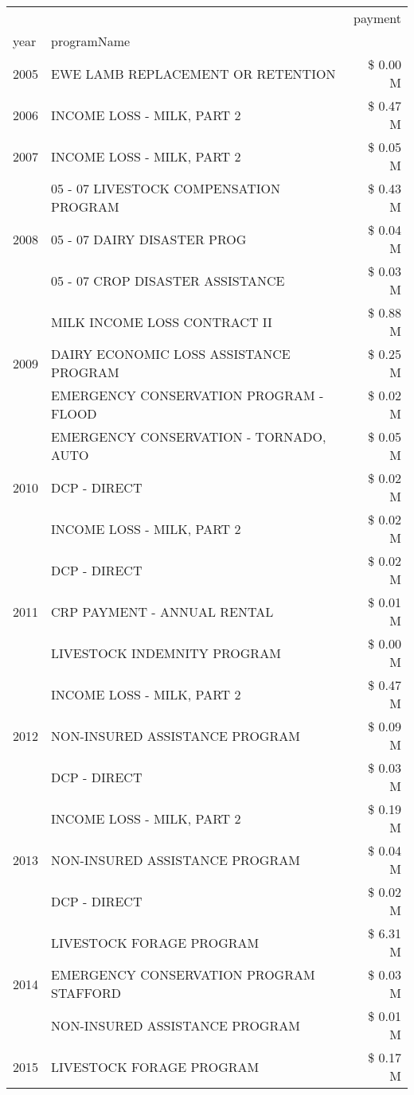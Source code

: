 \begin{tabular}{llr}
\toprule
 &  & payment \\
year & programName &  \\
\midrule
2005 & EWE LAMB REPLACEMENT OR RETENTION & \$ 0.00 M \\
\cline{1-3}
2006 & INCOME LOSS - MILK, PART 2 & \$ 0.47 M \\
\cline{1-3}
2007 & INCOME LOSS - MILK, PART 2 & \$ 0.05 M \\
\cline{1-3}
\multirow[t]{3}{*}{2008} & 05 - 07 LIVESTOCK COMPENSATION PROGRAM & \$ 0.43 M \\
 & 05 - 07 DAIRY DISASTER PROG & \$ 0.04 M \\
 & 05 - 07 CROP DISASTER ASSISTANCE & \$ 0.03 M \\
\cline{1-3}
\multirow[t]{3}{*}{2009} & MILK INCOME LOSS CONTRACT II & \$ 0.88 M \\
 & DAIRY ECONOMIC LOSS ASSISTANCE PROGRAM & \$ 0.25 M \\
 & EMERGENCY CONSERVATION PROGRAM - FLOOD & \$ 0.02 M \\
\cline{1-3}
\multirow[t]{3}{*}{2010} & EMERGENCY CONSERVATION - TORNADO, AUTO & \$ 0.05 M \\
 & DCP - DIRECT & \$ 0.02 M \\
 & INCOME LOSS - MILK, PART 2 & \$ 0.02 M \\
\cline{1-3}
\multirow[t]{3}{*}{2011} & DCP - DIRECT & \$ 0.02 M \\
 & CRP PAYMENT - ANNUAL RENTAL & \$ 0.01 M \\
 & LIVESTOCK INDEMNITY PROGRAM & \$ 0.00 M \\
\cline{1-3}
\multirow[t]{3}{*}{2012} & INCOME LOSS - MILK, PART 2 & \$ 0.47 M \\
 & NON-INSURED ASSISTANCE PROGRAM & \$ 0.09 M \\
 & DCP - DIRECT & \$ 0.03 M \\
\cline{1-3}
\multirow[t]{3}{*}{2013} & INCOME LOSS - MILK, PART 2 & \$ 0.19 M \\
 & NON-INSURED ASSISTANCE PROGRAM & \$ 0.04 M \\
 & DCP - DIRECT & \$ 0.02 M \\
\cline{1-3}
\multirow[t]{3}{*}{2014} & LIVESTOCK FORAGE PROGRAM & \$ 6.31 M \\
 & EMERGENCY CONSERVATION PROGRAM STAFFORD & \$ 0.03 M \\
 & NON-INSURED ASSISTANCE PROGRAM & \$ 0.01 M \\
\cline{1-3}
\multirow[t]{3}{*}{2015} & LIVESTOCK FORAGE PROGRAM & \$ 0.17 M \\

\end{tabular}
